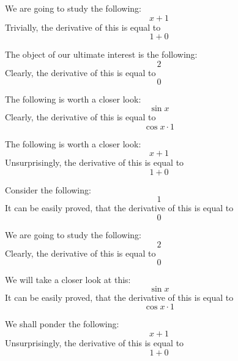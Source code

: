 \documentclass{article}
\begin{document}
We are going to study the following:
\begin{equation}
x + 1 
\end{equation}
Trivially, the derivative of this is equal to
\begin{equation}
1 + 0 
\end{equation}

The object of our ultimate interest is the following:
\begin{equation}
2 
\end{equation}
Clearly, the derivative of this is equal to
\begin{equation}
0 
\end{equation}

The following is worth a closer look:
\begin{equation}
\sin x 
\end{equation}
Clearly, the derivative of this is equal to
\begin{equation}
\cos x \cdot 1 
\end{equation}

The following is worth a closer look:
\begin{equation}
x + 1 
\end{equation}
Unsurprisingly, the derivative of this is equal to
\begin{equation}
1 + 0 
\end{equation}

Consider the following:
\begin{equation}
1 
\end{equation}
It can be easily proved, that the derivative of this is equal to
\begin{equation}
0 
\end{equation}

We are going to study the following:
\begin{equation}
2 
\end{equation}
Clearly, the derivative of this is equal to
\begin{equation}
0 
\end{equation}

We will take a closer look at this:
\begin{equation}
\sin x 
\end{equation}
It can be easily proved, that the derivative of this is equal to
\begin{equation}
\cos x \cdot 1 
\end{equation}

We shall ponder the following:
\begin{equation}
x + 1 
\end{equation}
Unsurprisingly, the derivative of this is equal to
\begin{equation}
1 + 0 
\end{equation}
\end{document}
